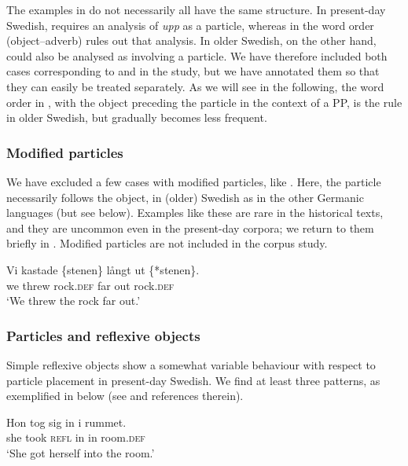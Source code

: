 \documentclass[output=paper]{langscibook}
\begin{document}
The examples in  do not necessarily all have the same structure. In present-day Swedish,  requires an analysis of \textit{upp} as a particle, whereas in  the word order (object–adverb) rules out that analysis. In older Swedish, on the other hand,  could also be analysed as involving a particle. We have therefore included both cases corresponding to  and  in the study, but we have annotated them so that they can easily be treated separately. As we will see in the following, the word order in , with the object preceding the particle in the context of a PP, is the rule in older Swedish, but gradually becomes less frequent.



\subsubsection{Modified particles} 
We have excluded a few cases with modified particles, like . Here, the particle necessarily follows the object, in (older) Swedish as in the other Germanic languages (but see  below). Examples like these are rare in the historical texts, and they are uncommon even in the present-day corpora; we return to them briefly in . Modified particles are not included in the corpus study.


\ea\label{ex:lalu:18}
\gll Vi    kastade   \{stenen\}     långt  ut \{*stenen\}.\\
we    threw       rock\textsc{.def}   far   out     rock\textsc{.def}    \\
\glt `We threw the rock far out.'
\z


\subsubsection{Particles and reflexive objects} 
Simple reflexive objects show a somewhat variable behaviour with respect to particle placement in present-day Swedish. We find at least three patterns, as exemplified in  below (see \citealt{Lundquist2014Reflexive} and references therein).


\ea\label{ex:lalu:19}
\ea\label{ex:lalu:19a}
\gll  Hon   tog     sig     in   i     rummet.\\
    she       took   \textsc{refl}   in   in     room\textsc{.def}\\
\glt `She got herself into the room.’\\
\end{document}
